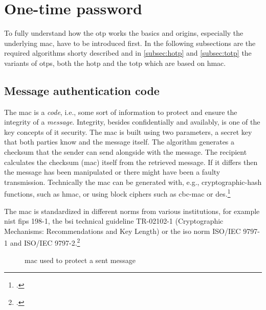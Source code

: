 \section{One-time password}

To fully understand how the \gls{otp} works the basics and origins, especially the underlying \gls{mac}, have to be introduced first. In the following subsections are the required algorithms shorty described and in \autoref{subsec:hotp} and \autoref{subsec:totp} the variants of \glspl{otp}, both the \gls{hotp} and the \gls{totp} which are based on \gls{hmac}.

\newpage

\subsection{Message authentication code}

The \gls{mac} is a \textit{code}, i.e., some sort of information to protect and ensure the integrity of a \textit{message}. Integrity, besides confidentially and availably, is one of the key concepts of \gls{it} security. The \gls{mac} is built using two parameters, a secret key that both parties know and the message itself. The algorithm generates a checksum that the sender can send alongside with the message. The recipient calculates the checksum (\gls{mac}) itself from the retrieved message. If it differs then the message has been manipulated or there might have been a faulty transmission. Technically the \gls{mac} can be generated with, e.g., cryptographic-hash functions, such as \gls{hmac}, or using block ciphers such as \gls{cbc-mac} or \gls{des}.\footcites[See][565]{320284}[See][163--168]{anderson2008security}[See][391--393]{eckert-it-sec-9}

The \gls{mac} is standardized in different norms from various institutions, for example \gls{nist} \gls{fips} 198-1, the \gls{bsi} technical guideline TR-02102-1 (\frqq Cryptographic Mechanisms: Recommendations and Key Length\flqq{}) or the \gls{iso} norm ISO/IEC 9797-1 and ISO/IEC 9797-2.\footcites[See][]{FIPS198}[See][]{bsi2019recommendations}[See][]{iso9797-1}[See][]{iso9797-2}

\newpage

\begin{figure}[hbt]
	\centering
	
	\caption[\Glsdesc{mac} used to protect a sent message]{\Glsdesc{mac} used to protect a sent message\footnotemark}
	\label{fig:mac}
\end{figure}

